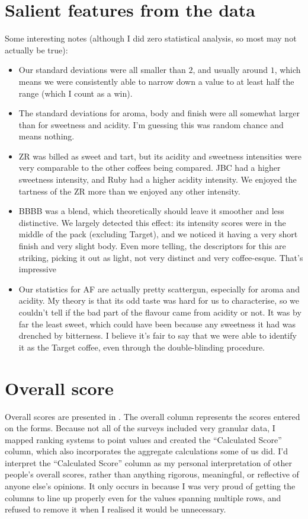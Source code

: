 \documentclass[12pt]{article}
\begin{document}
\section{Salient features from the data} \label{sec:SalientFeatures}
Some interesting notes (although I did zero statistical analysis, so most may not actually be true):
\begin{itemize}
	\item Our standard deviations were all smaller than $2$, and usually around $1$, which means we were consistently able to narrow down a value to at least half the range (which I count as a win).
	\item The standard deviations for aroma, body and finish were all somewhat larger than for sweetness and acidity.
	I'm guessing this was random chance and means nothing.
	\item ZR was billed as sweet and tart, but its acidity and sweetness intensities were very comparable to the other coffees being compared.
	JBC had a higher sweetness intensity, and Ruby had a higher acidity intensity.
	We enjoyed the tartness of the ZR more than we enjoyed any other intensity.
	\item BBBB was a blend, which theoretically should leave it smoother and less distinctive.
	We largely detected this effect: its intensity scores were in the middle of the pack (excluding Target), and we noticed it having a very short finish and very slight body.
	Even more telling, the descriptors for this are striking, picking it out as light, not very distinct and very coffee-esque.
	That's impressive
	\item Our statistics for AF are actually pretty scattergun, especially for aroma and acidity.
	My theory is that its odd taste was hard for us to characterise, so we couldn't tell if the bad part of the flavour came from acidity or not.
	It was by far the least sweet, which could have been because any sweetness it had was drenched by bitterness.
	I believe it's fair to say that we were able to identify it as the Target coffee, even through the double-blinding procedure.
\end{itemize}

\section{Overall score} \label{sec:Overall}
Overall scores are presented in .
The overall column represents the scores entered on the forms.
Because not all of the surveys included very granular data, I mapped ranking systems to point values and created the ``Calculated Score'' column, which also incorporates the aggregate calculations some of us did.
I'd interpret the ``Calculated Score'' column as my personal interpretation of other people's overall scores, rather than anything rigorous, meaningful, or reflective of anyone else's opinions.
It only occurs in  because I was very proud of getting the columns to line up properly even for the values spanning multiple rows, and refused to remove it when I realised it would be unnecessary.
\end{document}
